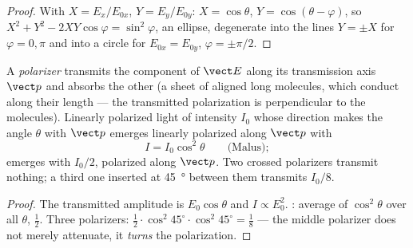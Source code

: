 \begin{proof}
With $X = E_x/E_{0x}$, $Y = E_y/E_{0y}$: $X = \cos\theta$, $Y = \cos(\theta - \varphi)$, so
$X^2 + Y^2 - 2XY\cos\varphi = \sin^2\varphi$, an ellipse, degenerate into the
lines $Y = \pm X$ for $\varphi = 0, \pi$ and into a circle for $E_{0x} = E_{0y}$,
$\varphi = \pm\pi/2$.
\end{proof}

\begin{proposition}\label{prop:b2:plane-waves-polarization:malus}
A \emph{polarizer} transmits the component of $\vect E$ along its
transmission axis $\vect p$ and absorbs the other (a sheet of aligned
long molecules, which conduct along their length --- the transmitted
polarization is perpendicular to the molecules). Linearly polarized
light of intensity $I_0$ whose direction makes the angle $\theta$ with
$\vect p$ emerges linearly polarized along $\vect p$ with
\[
I = I_0\cos^2\theta \qquad\text{(Malus)} ;
\]
 emerges with $I_0/2$, polarized along $\vect p$. Two
crossed polarizers transmit nothing; a third one inserted at
\qty{45}{\degree} between them transmits $I_0/8$.
\end{proposition}

\begin{proof}
The transmitted amplitude is $E_0\cos\theta$ and $I \propto E_0^2$. : average of $\cos^2\theta$ over all $\theta$, $\tfrac12$. Three polarizers:
$\tfrac12\cdot\cos^2 45^\circ\cdot\cos^2 45^\circ = \tfrac18$ --- the middle
polarizer does not merely attenuate, it \emph{turns} the polarization.
\end{proof}

